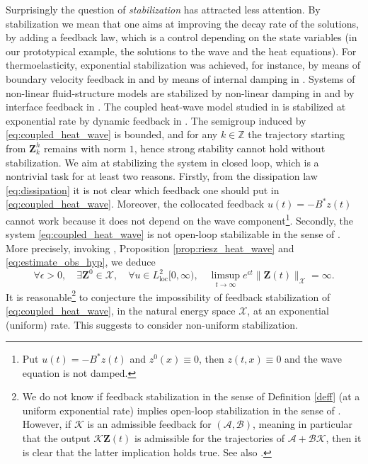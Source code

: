 \documentclass[10pt]{article}
\newcommand{\oploc}{\operatorname{loc}}
\begin{document}
Surprisingly the question of \textit{stabilization} has attracted less attention. By stabilization we mean that one aims at improving the decay rate of the solutions, by adding a feedback law, which is a control depending on the state variables (in our prototypical example, the solutions to the wave and the heat equations). For thermoelasticity, exponential stabilization was achieved, for instance, by means of boundary velocity feedback in \cite{liu} and by means of internal damping in \cite{benabd}. Systems of non-linear fluid-structure models are stabilized by non-linear damping in \cite{lasiecka_stbl_damping} and by interface feedback in \cite{lasiecka_stbl_interface}. The coupled heat-wave model studied in \cite{Zhang_Zuazua} is stabilized at exponential rate by dynamic feedback in \cite{zheng}. 
\newline
\newline
The semigroup induced by \eqref{eq:coupled_heat_wave} is bounded, and for any $k \in \mathbb{Z}$ the trajectory starting from $\mathbf{Z}_k^h$ remains with norm $1$, hence strong stability cannot hold without stabilization. We aim at stabilizing the system in closed loop, which is a nontrivial task for at least two reasons. Firstly, from the dissipation law \eqref{eq:dissipation} it is not clear which feedback one should put in \eqref{eq:coupled_heat_wave}. Moreover, the collocated feedback $u(t) = -B^*z(t)$ cannot work because it does not depend on the wave component\footnote{Put $u(t) = -B^*z(t)$ and $z^0(x) \equiv 0$, then $z(t,x) \equiv 0$ and the wave equation is not damped.}. Secondly, the system \eqref{eq:coupled_heat_wave} is not open-loop stabilizable in the sense of \cite{rebarber_zwart}. More precisely, invoking \cite[Theorem 4.5]{rebarber_zwart}, Proposition \ref{prop:riesz_heat_wave} and \eqref{eq:estimate_obs_hyp}, we deduce
\begin{equation}\label{barb}
\forall \epsilon > 0,\quad \exists \mathbf{Z}^0 \in \mathcal{X}	,\quad \forall u \in L^2_{\oploc}[0,\infty),\quad \limsup_{t \to \infty} e^{\epsilon t} \|  \mathbf{Z}(t) \|_\mathcal{X} = \infty.
\end{equation}
It is reasonable\footnote{We do not know if feedback stabilization in the sense of Definition \ref{deff} (at a uniform exponential rate) implies open-loop stabilization in the sense of \cite{rebarber_zwart}. However, if $\mathcal{K}$ is an admissible feedback for $(\mathcal{A}, \mathcal{B})$, meaning in particular that the output $\mathcal{K} \mathbf{Z}(t)$ is admissible for the trajectories of $\mathcal{A} + \mathcal{B}\mathcal{K}$, then it is clear that the latter implication holds true. See also \cite{rebarber_weiss, jacob_zwart}.} to conjecture the impossibility of feedback stabilization of \eqref{eq:coupled_heat_wave}, in the natural energy space $\mathcal{X}$, at an exponential (uniform) rate. This suggests to consider non-uniform stabilization. 
\end{document}
